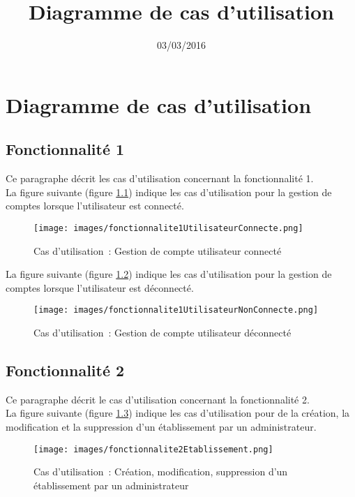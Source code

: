 \documentclass[asi, sansVersion]{picInsa}
\begin{document}
\title{Diagramme de cas d'utilisation}
\author{\Melissa}
\date{03/03/2016} 

\maketitle

\tableofcontents

\chapter{Diagramme de cas d'utilisation}

\section{Fonctionnalité 1}
Ce paragraphe décrit les cas d'utilisation concernant la fonctionnalité 1. \\

La figure suivante (figure \ref{diagrammeCasUtilisation1-1}) indique les cas d'utilisation pour la gestion de comptes lorsque l'utilisateur est connecté.
\begin{figure}[H]
	\centering
	\texttt{[image: images/fonctionnalite1UtilisateurConnecte.png]}
	\caption{Cas d'utilisation~: Gestion de compte utilisateur connecté }
	\label{diagrammeCasUtilisation1-1}
\end{figure}

La figure suivante (figure \ref{diagrammeCasUtilisation1-2}) indique les cas d'utilisation pour la gestion de comptes lorsque l'utilisateur est déconnecté.
\begin{figure}[H]
	\centering
	\texttt{[image: images/fonctionnalite1UtilisateurNonConnecte.png]}
	\caption{Cas d'utilisation~: Gestion de compte utilisateur déconnecté}
	\label{diagrammeCasUtilisation1-2}
\end{figure}

\section{Fonctionnalité 2}
Ce paragraphe décrit le cas d'utilisation concernant la fonctionnalité 2. \\

La figure suivante (figure \ref{diagrammeCasUtilisation2}) indique les cas d'utilisation pour de la création, la modification et la suppression d'un établissement par un administrateur.
\begin{figure}[H]
	\centering
	\texttt{[image: images/fonctionnalite2Etablissement.png]}
	\caption{Cas d'utilisation~: Création, modification, suppression d'un établissement par un administrateur}
	\label{diagrammeCasUtilisation2}
\end{figure}
\end{document}
